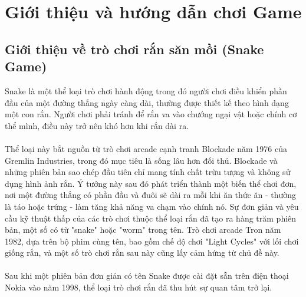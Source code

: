 \documentclass[a4paper, 12pt]{article}
\begin{document}
\section{Giới thiệu và hướng dẫn chơi Game}
\subsection{Giới thiệu về trò chơi rắn săn mồi (Snake Game)}
Snake là một thể loại trò chơi hành động trong đó người chơi điều khiển phần đầu của một đường thẳng ngày càng dài, thường được thiết kế theo hình dạng một con rắn. Người chơi phải tránh để rắn va vào chướng ngại vật hoặc chính cơ thể mình, điều này trở nên khó hơn khi rắn dài ra.
\\\\
Thể loại này bắt nguồn từ trò chơi arcade cạnh tranh Blockade năm 1976 của Gremlin Industries, trong đó mục tiêu là sống lâu hơn đối thủ. Blockade và những phiên bản sao chép đầu tiên chỉ mang tính chất trừu tượng và không sử dụng hình ảnh rắn. Ý tưởng này sau đó phát triển thành một biến thể chơi đơn, nơi một đường thẳng có phần đầu và đuôi sẽ dài ra mỗi khi ăn thức ăn - thường là táo hoặc trứng - làm tăng khả năng va chạm vào chính nó. Sự đơn giản và yêu cầu kỹ thuật thấp của các trò chơi thuộc thể loại rắn đã tạo ra hàng trăm phiên bản, một số có từ "snake" hoặc "worm" trong tên. Trò chơi arcade Tron năm 1982, dựa trên bộ phim cùng tên, bao gồm chế độ chơi "Light Cycles" với lối chơi giống rắn, và một số trò chơi rắn sau này cũng lấy cảm hứng từ chủ đề này.
\\\\
Sau khi một phiên bản đơn giản có tên Snake được cài đặt sẵn trên điện thoại Nokia vào năm 1998, thể loại trò chơi rắn đã thu hút sự quan tâm trở lại.
\end{document}
